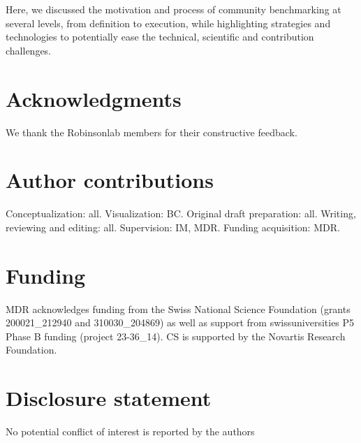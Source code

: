 \documentclass[11pt]{article}
\begin{document}
Here, we discussed the motivation and process of community benchmarking at several levels, from definition to execution, while highlighting strategies and technologies to potentially ease the technical, scientific and contribution challenges. 

\hfill

\section*{Acknowledgments} 

We thank the Robinsonlab members for their constructive feedback.

\section*{Author contributions}

Conceptualization: all. Visualization: BC. Original draft preparation: all. Writing, reviewing and editing: all. Supervision: IM, MDR. Funding acquisition: MDR.

\section*{Funding}

MDR acknowledges funding from the Swiss National Science Foundation (grants 200021\_212940 and 310030\_204869) as well as support from swissuniversities P5 Phase B funding (project 23-36\_14). CS is supported by the Novartis Research Foundation.

\section*{Disclosure statement}

No potential conflict of interest is reported by the authors

\pagebreak
\linespread{1} 

\end{document}
